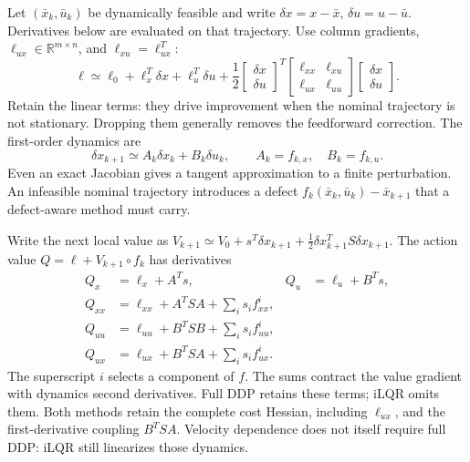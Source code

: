 Let $(\bar x_k,\bar u_k)$ be dynamically feasible and write
$\delta x=x-\bar x$, $\delta u=u-\bar u$. Derivatives below are evaluated
on that trajectory. Use column gradients,
$\ell_{ux}\in\mathbb R^{m\times n}$, and $\ell_{xu}=\ell_{ux}^T$:
\begin{equation}
\ell\simeq\ell_0+\ell_x^T\delta x+\ell_u^T\delta u+
\frac12\begin{bmatrix}\delta x\\\delta u\end{bmatrix}^{T}
\begin{bmatrix}\ell_{xx}&\ell_{xu}\\\ell_{ux}&\ell_{uu}\end{bmatrix}
\begin{bmatrix}\delta x\\\delta u\end{bmatrix}.
\label{eq:ch5:cost-expansion}
\end{equation}
Retain the linear terms: they drive improvement when the nominal trajectory
is not stationary. Dropping them generally removes the feedforward correction.
The first-order dynamics are
\begin{equation}
\delta x_{k+1}\simeq A_k\delta x_k+B_k\delta u_k,
\qquad A_k=f_{k,x},\quad B_k=f_{k,u}.
\label{eq:ch5:perturbation}
\end{equation}
Even an exact Jacobian gives a tangent approximation to a finite perturbation.
An infeasible nominal trajectory introduces a defect
$f_k(\bar x_k,\bar u_k)-\bar x_{k+1}$ that a defect-aware method must carry.

Write the next local value as
$V_{k+1}\simeq V_0+s^T\delta x_{k+1}+\tfrac12\delta x_{k+1}^TS\delta x_{k+1}$.
The action value $Q=\ell+V_{k+1}\circ f_k$ has derivatives
\begin{align}
Q_x&=\ell_x+A^Ts,&Q_u&=\ell_u+B^Ts,\label{eq:ch5:Qx}\\
Q_{xx}&=\ell_{xx}+A^TSA+\sum_i s_i f^i_{xx},\label{eq:ch5:Qxx}\\
Q_{uu}&=\ell_{uu}+B^TSB+\sum_i s_i f^i_{uu},\label{eq:ch5:Quu}\\
Q_{ux}&=\ell_{ux}+B^TSA+\sum_i s_i f^i_{ux}.\label{eq:ch5:Qxu}
\end{align}
The superscript $i$ selects a component of $f$. The sums contract the value
gradient with dynamics second derivatives. Full DDP retains these terms;
iLQR omits them. Both methods retain the complete cost Hessian, including
$\ell_{ux}$, and the first-derivative coupling $B^TSA$. Velocity dependence
does not itself require full DDP: iLQR still linearizes those dynamics.

